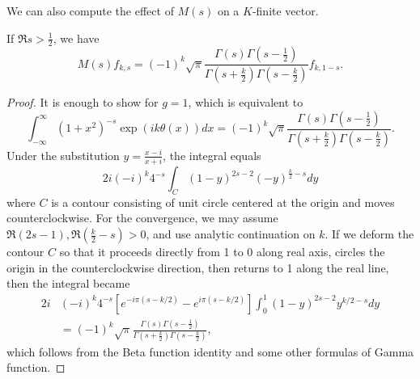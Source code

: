 We can also compute the effect of $M(s)$ on a $K$-finite vector. 
\begin{proposition}
If $\Re s>\frac{1}{2}$, we have
$$M(s)f_{k, s} = (-1)^{k} \sqrt{\pi} \frac{\Gamma(s)\Gamma\left( s- \frac{1}{2}\right)}{\Gamma\left(s+\frac{k}{2}\right)\Gamma\left(s-\frac{k}{2}\right)} f_{k, 1-s}.$$
\end{proposition}
\begin{proof}
It is enough to show for $g = 1$, which is equivalent to 
$$
\int_{-\infty}^{\infty} (1+x^{2})^{-s}\exp(ik\theta(x)) dx = (-1)^{k} \sqrt{\pi} \frac{\Gamma(s)\Gamma\left( s-\frac{1}{2}\right)}{\Gamma\left(s+\frac{k}{2}\right)\Gamma\left(s-\frac{k}{2}\right)}.
$$
Under the substitution $y = \frac{x-i}{x+i}$, the integral equals
$$
2i(-i)^{k} 4^{-s} \int_{C} (1-y)^{2s-2}(-y)^{\frac{k}{2}-s}dy
$$
where $C$ is a contour consisting of  unit circle centered at the origin and moves counterclockwise. 
For the convergence, we may assume $\Re(2s - 1), \Re(\frac{k}{2}-s) >0$, and use analytic continuation on $k$. 
If we deform the contour $C$ so that it proceeds directly from 1 to 0 along real axis, circles the origin in the counterclockwise direction, then returns to 1 along the real line, then the integral became
\begin{align*}
2i&(-i)^{k}4^{-s}[e^{-i\pi(s-k/2)} - e^{i\pi (s-k/2)}] \int_{0}^{1}(1-y)^{2s-2}y^{k/2-s}dy \\
&=(-1)^{k}\sqrt{\pi} \frac{\Gamma(s)\Gamma\left( s- \frac{1}{2}\right)}{\Gamma\left(s+\frac{k}{2}\right)\Gamma\left(s-\frac{k}{2}\right)},
\end{align*}
which follows from the Beta function identity and some other formulas of Gamma function. 
\end{proof}


